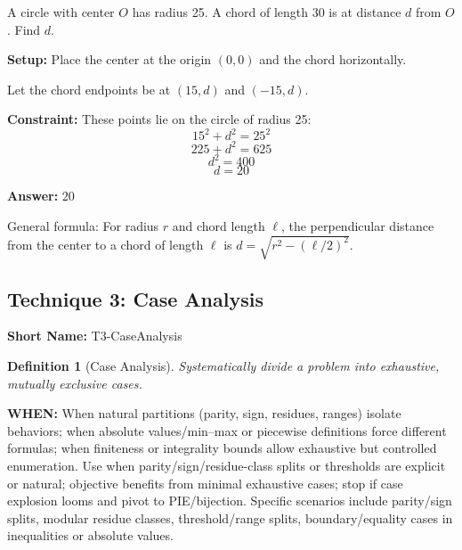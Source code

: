 \documentclass[12pt]{article}
\newtheorem{definition}{Definition}[section]
\newenvironment{problem}[1]
{\begin{tcolorbox}[colback=blue!5!white,colframe=blue!75!black,title={#1}]}{\end{tcolorbox}}
\newenvironment{solution}
{\begin{tcolorbox}[colback=green!5!white,colframe=green!75!black,title={Solution}]}{\end{tcolorbox}}
\begin{document}
\begin{problem}{AMC 12B 2018, Problem 11}
A circle with center $O$ has radius 25. A chord of length 30 is at distance $d$ from $O$. Find $d$.
\end{problem}

\begin{solution}
\textbf{Setup:} Place the center at the origin $(0,0)$ and the chord horizontally.

\begin{center}
\end{center}

Let the chord endpoints be at $(15, d)$ and $(-15, d)$.

\textbf{Constraint:} These points lie on the circle of radius 25:
$$15^2 + d^2 = 25^2$$
$$225 + d^2 = 625$$
$$d^2 = 400$$
$$d = 20$$

\textbf{Answer:} $20$

General formula: For radius \(r\) and chord length \(\ell\), the perpendicular distance from the center to a chord of length \(\ell\) is \(d = \sqrt{r^2 - (\ell/2)^2}\).
\end{solution}

\subsection{Technique 3: Case Analysis}
\textbf{Short Name:} T3-CaseAnalysis

\begin{definition}[Case Analysis]
Systematically divide a problem into exhaustive, mutually exclusive cases.
\end{definition}

\textbf{WHEN:} When natural partitions (parity, sign, residues, ranges) isolate behaviors; when absolute values/min–max or piecewise definitions force different formulas; when finiteness or integrality bounds allow exhaustive but controlled enumeration. Use when parity/sign/residue-class splits or thresholds are explicit or natural; objective benefits from minimal exhaustive cases; stop if case explosion looms and pivot to PIE/bijection. Specific scenarios include parity/sign splits, modular residue classes, threshold/range splits, boundary/equality cases in inequalities or absolute values.
\end{document}
